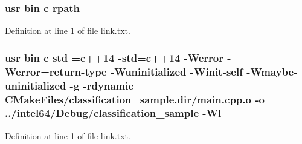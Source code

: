 \subsubsection[{\texorpdfstring{rpath}{rpath}}]{\setlength{\rightskip}{0pt plus 5cm}usr bin {\bf c} rpath}\hypertarget{classification__sample_2CMakeFiles_2classification__sample_8dir_2link_8txt_ab9d7fd7120fafa2118a4e08c1df697c7}{}\label{classification__sample_2CMakeFiles_2classification__sample_8dir_2link_8txt_ab9d7fd7120fafa2118a4e08c1df697c7}


Definition at line 1 of file link.\+txt.

\subsubsection[{\texorpdfstring{std}{std}}]{\setlength{\rightskip}{0pt plus 5cm}usr bin {\bf c} std ={\bf c}++14 -\/std={\bf c}++14 -\/Werror -\/Werror=return-\/type -\/Wuninitialized -\/Winit-\/self -\/Wmaybe-\/uninitialized -\/g -\/rdynamic C\+Make\+Files/classification\+\_\+sample.\+dir/main.\+cpp.\+o -\/o ../intel64/Debug/classification\+\_\+sample -\/{\bf Wl}}\hypertarget{classification__sample_2CMakeFiles_2classification__sample_8dir_2link_8txt_a1ccfea5f558575a112db71eeb271fabf}{}\label{classification__sample_2CMakeFiles_2classification__sample_8dir_2link_8txt_a1ccfea5f558575a112db71eeb271fabf}


Definition at line 1 of file link.\+txt.

